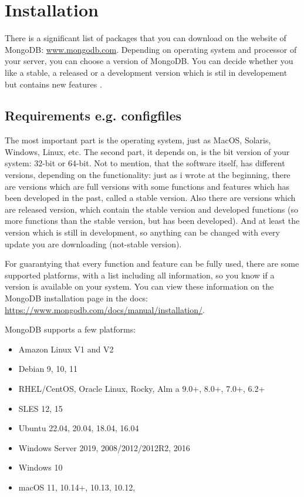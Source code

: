 
\section{Installation}
There is a significant list of packages that you can download on the website of MongoDB: \url{www.mongodb.com}. 
Depending on operating system and processor of your server, you can choose a version of MongoDB. 
You can decide whether you like a stable, a released or a development version which is stil in developement but contains new features \parencite{Membrey2014}.

\subsection{Requirements e.g. configfiles}
The most important part is the operating system, just as MacOS, Solaris, Windows, Linux, etc. 
The second part, it depends on, is the bit version of your  system: 32-bit or 64-bit. 
Not to mention, that the software itself, has different versions, depending on the functionality: just as i wrote at the beginning, there are versions which are full versions with some functions and features which has been developed in the past, called a stable version. 
Also there are versions which are released version, which contain the stable version and developed functions (so more functions than the stable version, but has been developed).
And at least the version which is still in development, so anything can be changed with every update you are downloading (not-stable version).

For guarantying that every function and feature can be fully used, there are some supported platforms, with a list including all information, so you know if a version is available on your system.
You can view these information on the MongoDB installation page in the docs: \url{https://www.mongodb.com/docs/manual/installation/}.

MongoDB supports a few platforms: 
\begin{itemize}
    \item Amazon Linux V1 and V2
    \item Debian 9, 10, 11
    \item RHEL/CentOS, Oracle Linux, Rocky, Alm a 9.0+, 8.0+, 7.0+, 6.2+
    \item SLES 12, 15
    \item Ubuntu 22.04, 20.04, 18.04, 16.04
    \item Windows Server 2019, 2008/2012/2012R2, 2016
    \item Windows 10
    \item macOS 11, 10.14+, 10.13, 10.12, 
\end{itemize}

